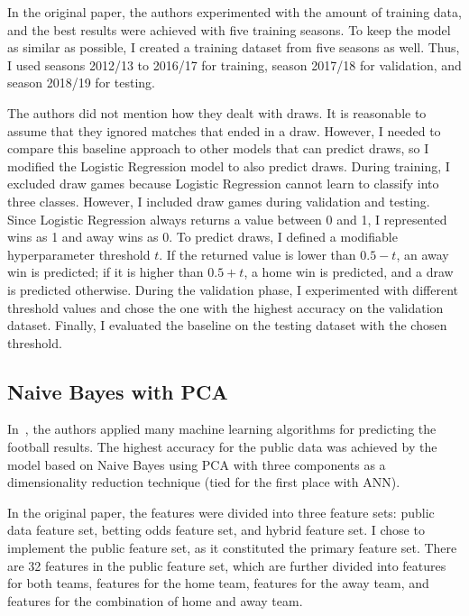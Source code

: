 \documentclass[thesis=M,english]{FITthesis}[2019/12/23]
\begin{document}
In the original paper, the authors experimented with the amount of training data, and the best results were achieved with five training seasons. To keep the model as similar as possible, I created a training dataset from five seasons as well. Thus, I used seasons 2012/13 to 2016/17 for training, season 2017/18 for validation, and season 2018/19 for testing.

The authors did not mention how they dealt with draws. It is reasonable to assume that they ignored matches that ended in a draw. However, I needed to compare this baseline approach to other models that can predict draws, so I modified the Logistic Regression model to also predict draws. During training, I excluded draw games because Logistic Regression cannot learn to classify into three classes. However, I included draw games during validation and testing. Since Logistic Regression always returns a value between 0 and 1, I represented wins as 1 and away wins as 0. To predict draws, I defined a modifiable hyperparameter threshold $t$. If the returned value is lower than $0.5 - t$, an away win is predicted; if it is higher than $0.5 + t$, a home win is predicted, and a draw is predicted otherwise. During the validation phase, I experimented with different threshold values and chose the one with the highest accuracy on the validation dataset. Finally, I evaluated the baseline on the testing dataset with the chosen threshold.

\subsection{Naive Bayes with PCA}
In~\cite{Dutch_football}, the authors applied many machine learning algorithms for predicting the football results. The highest accuracy for the public data was achieved by the model based on Naive Bayes using PCA with three components as a dimensionality reduction technique (tied for the first place with ANN). 

In the original paper, the features were divided into three feature sets: public data feature set, betting odds feature set, and hybrid feature set. I chose to implement the public feature set, as it constituted the primary feature set. There are 32 features in the public feature set, which are further divided into features for both teams, features for the home team, features for the away team, and features for the combination of home and away team.
\end{document}
